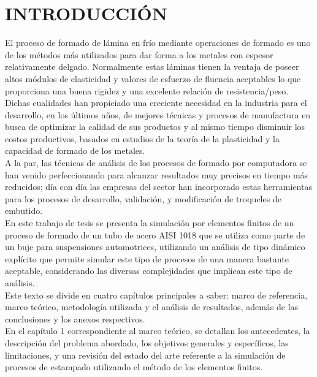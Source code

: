 \chapter*{INTRODUCCIÓN}


El proceso de formado de lámina en frío mediante operaciones de formado es uno de los métodos más 
utilizados para dar forma a los metales con espesor relativamente delgado. Normalmente estas láminas 
tienen la ventaja de poseer altos módulos de elasticidad y valores de esfuerzo de fluencia aceptables 
lo que proporciona una buena rigidez y una excelente relación de resistencia/peso. Dichas cualidades 
han propiciado una creciente necesidad en la industria para el desarrollo, en los últimos años, 
de mejores técnicas y procesos de manufactura en busca de optimizar la calidad de sus productos y al 
mismo tiempo disminuir los costos productivos, basados en estudios de la teoría de la plasticidad y la 
capacidad de formado de los metales.\\

A la par, las técnicas de análisis de los procesos de formado por computadora se han venido 
perfeccionando para alcanzar resultados muy precisos en tiempo más reducidos; día con día las 
empresas del sector han incorporado estas herramientas para los procesos de desarrollo, validación, 
y modificación de troqueles de embutido.\\

En este trabajo de tesis se presenta la simulación por elementos finitos de un proceso de formado 
de un tubo de acero AISI 1018 que se utiliza como parte de un buje para suspensiones automotrices, 
utilizando un análisis de tipo dinámico explícito que permite simular este tipo de procesos 
de una manera bastante aceptable, considerando las diversas complejidades que implican este tipo 
de análisis.\\

Este texto se divide en cuatro capítulos principales a saber: marco de referencia, marco teórico, 
metodología utilizada y el análisis de resultados, además de las conclusiones y los anexos respectivos.\\

En el capítulo 1 correspondiente al marco teórico, se detallan los antecedentes, la descripción 
del problema abordado, los objetivos generales y específicos, las limitaciones, y una 
revisión del estado del arte referente a la simulación de procesos de estampado utilizando 
el método de los elementos finitos.\\

